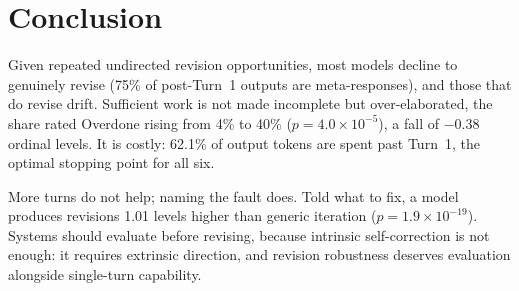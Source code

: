 \section{Conclusion}

Given repeated undirected revision opportunities, most models decline to genuinely revise (75\% of post-Turn~1 outputs are meta-responses), and those that do revise drift. Sufficient work is not made incomplete but over-elaborated, the share rated Overdone rising from 4\% to 40\% ($p = 4.0 \times 10^{-5}$), a fall of $-0.38$ ordinal levels. It is costly: 62.1\% of output tokens are spent past Turn~1, the optimal stopping point for all six.

More turns do not help; naming the fault does. Told what to fix, a model produces revisions 1.01 levels higher than generic iteration ($p = 1.9 \times 10^{-19}$). Systems should evaluate before revising, because intrinsic self-correction is not enough: it requires extrinsic direction, and revision robustness deserves evaluation alongside single-turn capability.
